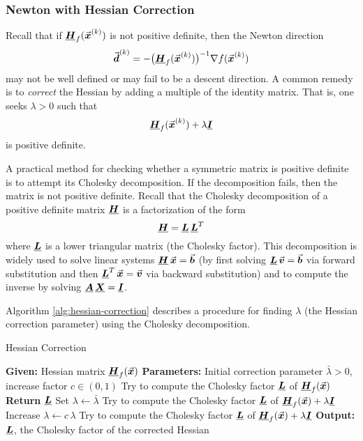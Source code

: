 
\subsubsection{Newton with Hessian Correction}

Recall that if 
\(
\underline{\boldsymbol{H}}_{f}(\vec{\boldsymbol{x}}^{(k)}) 
\)
is not positive definite, then the Newton direction
\[
\vect{d}^{(k)} = -\big(\matr{H}_{f}(\vect{x}^{(k)})\big)^{-1}\nabla f(\vect{x}^{(k)}) %
\]
may not be well defined or may fail to be a descent direction. A common remedy is to \emph{correct} the Hessian by adding a multiple of the identity matrix. That is, one seeks \(\lambda > 0\) such that
\[
\matr{H}_{f}(\vect{x}^{(k)}) + \lambda \matr{I} %
\]
is positive definite.

A practical method for checking whether a symmetric matrix is positive definite is to attempt its Cholesky decomposition. %
If the decomposition fails, then the matrix is not positive definite. 
Recall that the Cholesky decomposition of a positive definite matrix \(\underline{\boldsymbol{H}}\) is a factorization of the form
\[
\matr{H} = \matr{L}\,\matr{L}^T %
\]
where \(\underline{\boldsymbol{L}}\) is a lower triangular matrix (the Cholesky factor). 
This decomposition is widely used to solve linear systems \(\underline{\boldsymbol{H}}\,\vec{\boldsymbol{x}} = \vec{\boldsymbol{b}}\) (by first solving \(\underline{\boldsymbol{L}}\,\vec{\boldsymbol{v}}=\vec{\boldsymbol{b}}\) via forward substitution and then \(\underline{\boldsymbol{L}}^T\,\vec{\boldsymbol{x}}=\vec{\boldsymbol{v}}\) via backward substitution) and to compute the inverse by solving \(\underline{\boldsymbol{A}}\,\underline{\boldsymbol{X}} = \underline{\boldsymbol{I}}\).

Algorithm \ref{alg:hessian-correction} describes a procedure for finding \(\lambda\) (the Hessian correction parameter) using the Cholesky decomposition.

\begin{algorithm}[h]
\caption{Hessian Correction}\label{alg:hessian-correction}
\begin{algorithmic}[1]
    \State \textbf{Given:} Hessian matrix \(\underline{\boldsymbol{H}}_{f}(\vec{\boldsymbol{x}})\)
    \State \textbf{Parameters:} Initial correction parameter \(\bar{\lambda}>0\), increase factor \(c \in (0,1)\)
    \State Try to compute the Cholesky factor \(\underline{\boldsymbol{L}}\) of \(\underline{\boldsymbol{H}}_{f}(\vec{\boldsymbol{x}})\)
        \State \textbf{Return} \(\underline{\boldsymbol{L}}\)
    \EndIf
    \State Set \(\lambda \leftarrow \bar{\lambda}\)
    \State Try to compute the Cholesky factor \(\underline{\boldsymbol{L}}\) of \(\underline{\boldsymbol{H}}_{f}(\vec{\boldsymbol{x}}) + \lambda \underline{\boldsymbol{I}}\)
        \State Increase \(\lambda \leftarrow c\,\lambda\)
        \State Try to compute the Cholesky factor \(\underline{\boldsymbol{L}}\) of \(\underline{\boldsymbol{H}}_{f}(\vec{\boldsymbol{x}}) + \lambda \underline{\boldsymbol{I}}\)
    \EndWhile
    \State \textbf{Output:} \(\underline{\boldsymbol{L}}\), the Cholesky factor of the corrected Hessian %
\end{algorithmic}
\end{algorithm}


